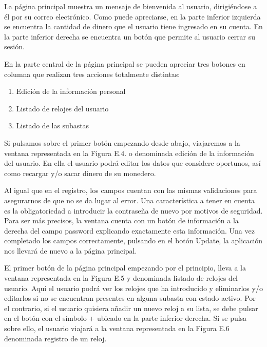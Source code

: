 	La página principal muestra un mensaje de bienvenida al usuario, dirigiéndose a él por su correo electrónico. Como puede apreciarse, en la parte inferior izquierda se encuentra la cantidad de dinero que el usuario tiene ingresado en su cuenta. En la parte inferior derecha se encuentra un botón que permite al usuario cerrar su sesión.
	
	En la parte central de la página principal se pueden apreciar tres botones en columna que realizan tres acciones totalmente distintas:
	\begin{enumerate}
		\item Edición de la información personal
		\item Listado de relojes del usuario
		\item Listado de las subastas
	\end{enumerate}
	
	Si pulsamos sobre el primer botón empezando desde abajo, viajaremos a la ventana representada en la Figura E.4. o denominada edición de la información del usuario. En ella el usuario podrá editar los datos que considere oportunos, así como recargar y/o sacar dinero de su monedero.
	

	Al igual que en el registro, los campos cuentan con las mismas validaciones para asegurarnos de que no se da lugar al error. Una característica a tener en cuenta es la obligatoriedad a introducir la contraseña de nuevo por motivos de seguridad. Para ser más precisos, la ventana cuenta con un botón de información a la derecha del campo password explicando exactamente esta información. Una vez completado los campos correctamente, pulsando en el botón Update, la aplicación nos llevará de nuevo a la página principal.
	
	El primer botón de la página principal empezando por el principio, lleva a la ventana representada en la Figura E.5 y denominada listado de relojes del usuario. Aquí el usuario podrá ver los relojes que ha introducido y eliminarlos y/o editarlos si no se encuentran presentes en alguna subasta con estado activo. Por el contrario, si el usuario quisiera añadir un nuevo reloj a su lista, se debe pulsar en el botón con el símbolo + ubicado en la parte inferior derecha. Si se pulsa sobre ello, el usuario viajará a la ventana representada en la Figura E.6 denominada registro de un reloj.


